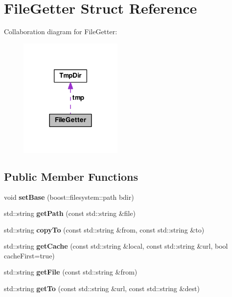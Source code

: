 \hypertarget{struct_file_getter}{\section{File\-Getter Struct Reference}
\label{struct_file_getter}
}


Collaboration diagram for File\-Getter\-:
\nopagebreak
\begin{figure}[H]
\begin{center}
\leavevmode
\includegraphics[width=144pt]{struct_file_getter__coll__graph}
\end{center}
\end{figure}
\subsection*{Public Member Functions}
\begin{DoxyCompactItemize}
\item 
\hypertarget{struct_file_getter_a035e3254227362c120b5855e26614b63}{void {\bfseries set\-Base} (boost\-::filesystem\-::path bdir)}\label{struct_file_getter_a035e3254227362c120b5855e26614b63}

\item 
\hypertarget{struct_file_getter_ac40d3879ef674cd60503c4aa014d58b0}{std\-::string {\bfseries get\-Path} (const std\-::string \&file)}\label{struct_file_getter_ac40d3879ef674cd60503c4aa014d58b0}

\item 
\hypertarget{struct_file_getter_a92daf505b223c582ca042a46ffb0d0aa}{std\-::string {\bfseries copy\-To} (const std\-::string \&from, const std\-::string \&to)}\label{struct_file_getter_a92daf505b223c582ca042a46ffb0d0aa}

\item 
\hypertarget{struct_file_getter_a243c9bceb72f3ad7f4ed7ce1438b7a94}{std\-::string {\bfseries get\-Cache} (const std\-::string \&local, const std\-::string \&url, bool cache\-First=true)}\label{struct_file_getter_a243c9bceb72f3ad7f4ed7ce1438b7a94}

\item 
\hypertarget{struct_file_getter_a9e92f09ecdf1a4e998d3437275bc5a0f}{std\-::string {\bfseries get\-File} (const std\-::string \&from)}\label{struct_file_getter_a9e92f09ecdf1a4e998d3437275bc5a0f}

\item 
\hypertarget{struct_file_getter_a875560c4fcaa283456bcc43eb9a757f3}{std\-::string {\bfseries get\-To} (const std\-::string \&url, const std\-::string \&dest)}\label{struct_file_getter_a875560c4fcaa283456bcc43eb9a757f3}

\end{DoxyCompactItemize}
